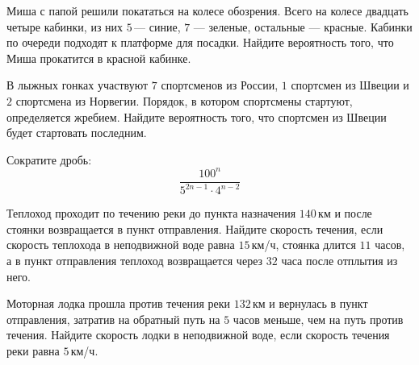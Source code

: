 \begin{homework}[number=1]
	\begin{listofex}
		\item Миша с папой решили покататься на колесе обозрения. Всего на колесе двадцать четыре кабинки, из них \( 5 \) --- синие, \( 7 \) --- зеленые, остальные --- красные. Кабинки по очереди подходят к платформе для посадки. Найдите вероятность того, что Миша прокатится в красной кабинке.
		\item В лыжных гонках участвуют \( 7 \) спортсменов из России, \( 1 \) спортсмен из Швеции и \( 2 \) спортсмена из Норвегии. Порядок, в котором спортсмены стартуют, определяется жребием. Найдите вероятность того, что спортсмен из Швеции будет стартовать последним.
		\item Сократите дробь: \[\dfrac{100^n}{5^{2n-1}\cdot4^{n-2}}\]
		\item Теплоход проходит по течению реки до пункта назначения \( 140 \) км и после стоянки возвращается в пункт отправления. Найдите скорость течения, если скорость теплохода в неподвижной воде равна \( 15 \) км/ч, стоянка длится \( 11 \) часов, а в пункт отправления теплоход возвращается через \( 32 \) часа после отплытия из него.
		\item Моторная лодка прошла против течения реки \( 132 \) км и вернулась в пункт отправления, затратив на обратный путь на \( 5 \) часов меньше, чем на путь против течения. Найдите скорость лодки в неподвижной воде, если скорость течения реки равна \( 5 \) км/ч.
	\end{listofex}
\end{homework}

